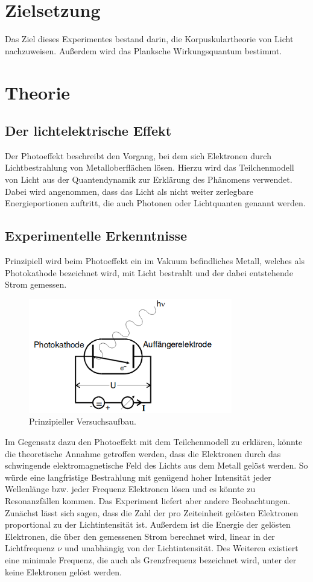 \section{Zielsetzung}
Das Ziel dieses Experimentes bestand darin, die Korpuskulartheorie von Licht nachzuweisen.
Außerdem wird das Planksche Wirkungsquantum bestimmt.

\section{Theorie}
\subsection{Der lichtelektrische Effekt}
Der Photoeffekt beschreibt den Vorgang, bei dem sich Elektronen durch Lichtbestrahlung von Metalloberflächen lösen.
Hierzu wird das Teilchenmodell von Licht aus der Quantendynamik zur Erklärung des Phänomens verwendet.
Dabei wird angenommen, dass das Licht als nicht weiter zerlegbare Energieportionen auftritt, die auch Photonen oder Lichtquanten genannt werden.


\subsection{Experimentelle Erkenntnisse}
Prinzipiell wird beim Photoeffekt ein im Vakuum befindliches Metall, welches als Photokathode bezeichnet wird, mit Licht bestrahlt und der dabei entstehende Strom gemessen.

\begin{figure}[h]
    \centering
    \includegraphics[height=5cm]{Theorie/Prinzip.png}
    \caption{Prinzipieller Versuchsaufbau.}
    \label{fig:prinzip}
\end{figure}

Im Gegensatz dazu den Photoeffekt mit dem Teilchenmodell zu erklären, könnte die theoretische Annahme getroffen werden, dass die Elektronen durch das schwingende elektromagnetische Feld des Lichts aus dem Metall gelöst werden.
So würde eine langfristige Bestrahlung mit genügend hoher Intensität jeder Wellenlänge bzw. jeder Frequenz Elektronen lösen und es könnte zu Resonanzfällen kommen.
Das Experiment liefert aber andere Beobachtungen.
Zunächst lässt sich sagen, dass die Zahl der pro Zeiteinheit gelösten Elektronen proportional zu der Lichtintensität ist.
Außerdem ist die Energie der gelösten Elektronen, die über den gemessenen Strom berechnet wird, linear in der Lichtfrequenz $\nu$ und unabhängig von der Lichtintensität.
Des Weiteren existiert eine minimale Frequenz, die auch als Grenzfrequenz bezeichnet wird, unter der keine Elektronen gelöst werden.\\

